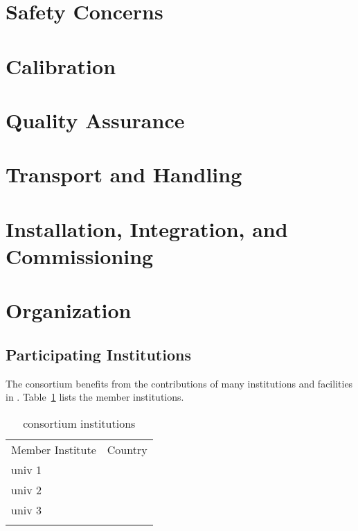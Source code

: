 \section{Safety Concerns}
\label{sec:lartpc-safety}

\section{Calibration}
\label{sec:lartpc-calib}

\section{Quality Assurance}
\label{sec:lartpc-qa}

\section{Transport and Handling}
\label{sec:lartpc-transport}

\section{Installation, Integration, and Commissioning}
\label{sec:lartpc-iic}

\section{Organization}
\label{sec:lartpc-org}

\subsection{Participating Institutions}
\label{sec:fdsp-org-inst}

The  consortium benefits from the contributions of many institutions and facilities in .  Table~\ref{tab:ndlar-institutes}
lists the member institutions. 

\begin{longtable}
{ll}
\caption{ consortium institutions}\\ \colhline
\rowcolor{dunetablecolor} Member Institute  &  Country       \\  \toprowrule
univ 1 &  \\ \colhline
univ 2 &  \\ \colhline
univ 3 &  \\ 
\label{tab:ndlar-institutes}
\end{longtable}









